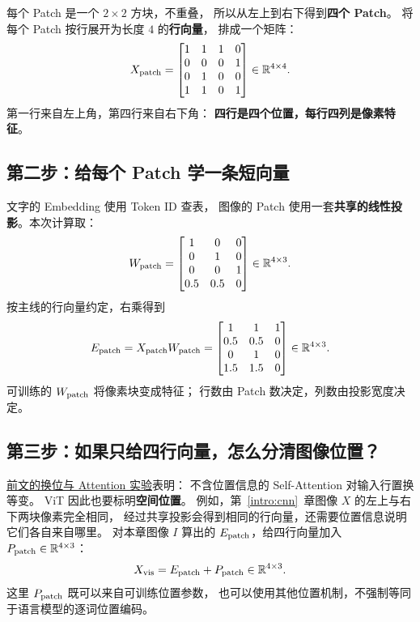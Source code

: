 每个 Patch 是一个 $2\times2$ 方块，不重叠，
所以从左上到右下得到\textbf{四个 Patch}。
将每个 Patch 按行展开为长度 $4$ 的\textbf{行向量}，
排成一个矩阵：
\begin{equation}
X_{\rm patch}=
\begin{bmatrix}
1&1&1&0\\
0&0&0&1\\
0&1&0&0\\
1&1&0&1
\end{bmatrix}\in\mathbb{R}^{4\times4}.
\label{eq:vit-four-patches}
\end{equation}
第一行来自左上角，第四行来自右下角：
\textbf{四行是四个位置，每行四列是像素特征}。

\subsection{第二步：给每个 Patch 学一条短向量}

文字的 Embedding 使用 Token ID 查表，
图像的 Patch 使用一套\textbf{共享的线性投影}。本次计算取：
\[
W_{\rm patch}=
\begin{bmatrix}
1&0&0\\
0&1&0\\
0&0&1\\
0.5&0.5&0
\end{bmatrix}\in\mathbb{R}^{4\times3}.
\]
按主线的行向量约定，右乘得到
\begin{equation}
\boxed{
E_{\rm patch}=X_{\rm patch}W_{\rm patch}
=\begin{bmatrix}
1&1&1\\
0.5&0.5&0\\
0&1&0\\
1.5&1.5&0
\end{bmatrix}\in\R^{4\times3}.
}
\label{eq:vit-patch-embedding}
\end{equation}
可训练的 $W_{\rm patch}$ 将像素块变成特征；
行数由 Patch 数决定，列数由投影宽度决定。

\subsection{第三步：如果只给四行向量，怎么分清图像位置？}

\hyperref[intro:position-multihead]{前文的换位与 Attention 实验}表明：
不含位置信息的 Self-Attention 对输入行置换等变。
ViT 因此也要标明\textbf{空间位置}。
例如，第~\ref*{intro:cnn}~章图像 $X$ 的左上与右下两块像素完全相同，
经过共享投影会得到相同的行向量，还需要位置信息说明它们各自来自哪里。
对本章图像 $I$ 算出的 $E_{\rm patch}$，给四行向量加入 $P_{\rm patch}\in\mathbb{R}^{4\times3}$：
\[
X_{\rm vis}=E_{\rm patch}+P_{\rm patch}\in\mathbb{R}^{4\times3}.
\]
这里 $P_{\rm patch}$ 既可以来自可训练位置参数，
也可以使用其他位置机制，不强制等同于语言模型的逐词位置编码。

